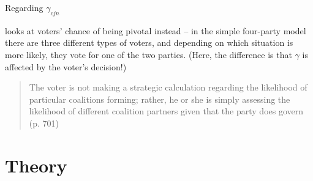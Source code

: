 \documentclass[11pt]{article}
\begin{document}
Regarding $\gamma_{cjn}$

\textcite{Herrmann2014} looks at voters' chance of being pivotal instead -- in the simple four-party model there are three different types of voters, and depending on which situation is more likely, they vote for one of the two parties. (Here, the difference is that $\gamma$ is affected by the voter's decision!)

\begin{quotation}
    The voter is not making a strategic calculation regarding the likelihood of particular coalitions forming; rather, he or she is simply assessing the likelihood of different coalition partners given that the party does govern (p. 701)
\end{quotation}

\section{Theory}

\renewcommand*{\mkbibnamefamily}[1]{\textsc{\textbf{#1}}}
\renewcommand*{\mkbibnamegiven}[1]{\textsc{#1}}
\printbibliography
\end{document}
